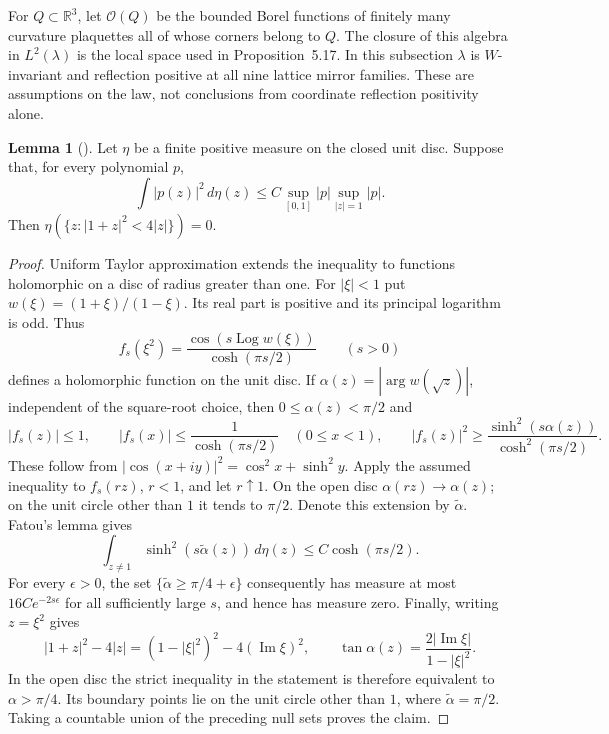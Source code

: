 \documentclass[11pt,letterpaper,reqno]{amsart}
\theoremstyle{definition}
\newtheorem{qcmlemma}[qcmproposition]{Lemma}
\newenvironment{lemma}[1][]{\pushQED{\qed}\renewcommand{\qedsymbol}{$\blacksquare$}\begin{qcmlemma}[#1]}{\popQED\end{qcmlemma}}
\begin{document}
For $Q\subset\mathbb R^3$, let $\mathcal O(Q)$ be the bounded Borel
functions of finitely many curvature plaquettes all of whose corners
belong to $Q$. The closure of this algebra in $L^2(\lambda)$ is the
local space used in Proposition~5.17. In this subsection $\lambda$
is $W$-invariant and reflection positive at all nine lattice mirror
families. These are assumptions on the law, not conclusions from
coordinate reflection positivity alone.

\begin{lemma}\label{qcm:disc-two-constants}
Let $\eta$ be a finite positive measure on the closed unit disc.
Suppose that, for every polynomial $p$,
\[
 \int|p(z)|^2\,d\eta(z)
 \le C\sup_{[0,1]}|p|\sup_{|z|=1}|p|.
\]
Then $\eta(\{z:|1+z|^2<4|z|\})=0$.
\end{lemma}

\begin{proof}
Uniform Taylor approximation extends the inequality to functions
holomorphic on a disc of radius greater than one. For $|\xi|<1$ put
$w(\xi)=(1+\xi)/(1-\xi)$. Its real part is positive and its principal
logarithm is odd. Thus
\[
 f_s(\xi^2)=\frac{\cos(s\operatorname{Log}w(\xi))}{\cosh(\pi s/2)}
 \qquad(s>0)
\]
defines a holomorphic function on the unit disc. If
$\alpha(z)=|\arg w(\sqrt z)|$, independent of the square-root choice,
then $0\le\alpha(z)<\pi/2$ and
\[
 |f_s(z)|\le1,\qquad
 |f_s(x)|\le\frac1{\cosh(\pi s/2)}\quad(0\le x<1),\qquad
 |f_s(z)|^2\ge\frac{\sinh^2(s\alpha(z))}{\cosh^2(\pi s/2)}.
\]
These follow from $|\cos(x+iy)|^2=\cos^2x+\sinh^2y$.
Apply the assumed inequality to $f_s(rz)$, $r<1$, and let $r\uparrow1$.
On the open disc $\alpha(rz)\to\alpha(z)$; on the unit circle other
than $1$ it tends to $\pi/2$. Denote this extension by
$\widetilde\alpha$. Fatou's lemma gives
\[
 \int_{z\ne1}\sinh^2(s\widetilde\alpha(z))\,d\eta(z)
 \le C\cosh(\pi s/2).
\]
For every $\epsilon>0$, the set
$\{\widetilde\alpha\ge\pi/4+\epsilon\}$ consequently has measure at
most $16C e^{-2s\epsilon}$ for all sufficiently large $s$, and hence
has measure zero. Finally, writing $z=\xi^2$ gives
\[
 |1+z|^2-4|z|=(1-|\xi|^2)^2-4(\operatorname{Im}\xi)^2,
 \qquad
 \tan\alpha(z)=\frac{2|\operatorname{Im}\xi|}{1-|\xi|^2}.
\]
In the open disc the strict inequality in the statement is therefore
equivalent to $\alpha>\pi/4$. Its boundary points lie on the unit
circle other than $1$, where $\widetilde\alpha=\pi/2$. Taking a
countable union of the preceding null sets proves the claim.
\end{proof}
\end{document}
